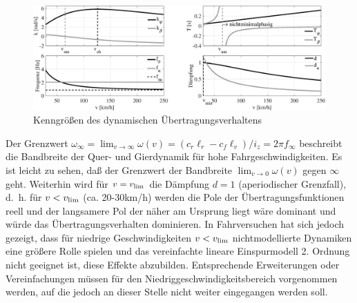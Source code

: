 \begin{figure}[thpb]


 	 \centering
	   \includegraphics[width=12cm]{Bilder/ESM/esm_erg.eps} 
%		
      \begin{center}
       \caption{Kenngrößen des dynamischen Übertragungsverhaltens}
     		 \label{fig:esm}
       \end{center}
\end{figure}      
Der Grenzwert $\omega_\infty=\lim_{v\to\infty} \omega(v)= (c_r \ell_r -c_f \ell_v)/i_z=2\pi f_\infty$ beschreibt die Bandbreite der Quer- und Gierdynamik für hohe Fahrgeschwindigkeiten. 
Es ist leicht zu sehen, daß der Grenzwert der Bandbreite $\lim_{v\to 0} \omega(v)$ gegen $\infty$ geht. Weiterhin wird für $v=v_{\rm lim}$ die Dämpfung $d=1$ (aperiodischer Grenzfall), d.~h. für $v<v_{\rm lim}$ (ca. 20-30km/h) werden die Pole der Übertragungsfunktionen reell und der langsamere Pol der näher am Ursprung liegt wäre dominant und würde das Übertragungsverhalten dominieren. In Fahrversuchen hat sich jedoch gezeigt, dass für niedrige Geschwindigkeiten $v<v_{\rm lim}$ nichtmodellierte Dynamiken eine größere Rolle spielen und    
das vereinfachte lineare Einspurmodell 2. Ordnung nicht geeignet ist, diese Effekte abzubilden. Entsprechende Erweiterungen oder Vereinfachungen müssen für den Niedriggeschwindigkeitsbereich vorgenommen werden, auf die jedoch an dieser Stelle nicht weiter eingegangen werden soll.
